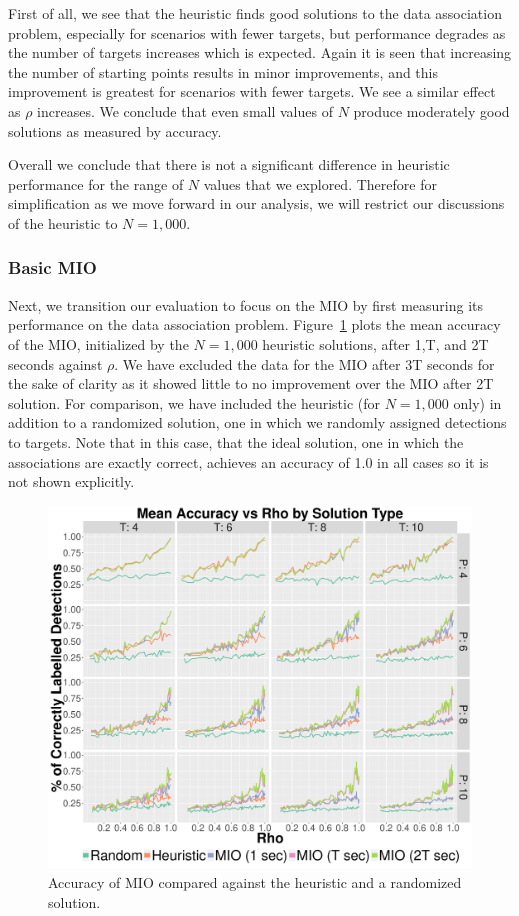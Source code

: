 First of all, we see that the heuristic finds good solutions to the data association problem, especially for scenarios with fewer targets, but performance degrades as the number of targets increases which is expected. Again it is seen that increasing the number of starting points results in minor improvements, and this improvement is greatest for scenarios with fewer targets. We see a similar effect as $\rho$ increases. We conclude that even small values of $N$ produce moderately good solutions as measured by accuracy.

Overall we conclude that there is not a significant difference in heuristic performance for the range of $N$ values that we explored. Therefore for simplification as we move forward in our analysis, we will restrict our discussions of the heuristic to $N=1,000$.

\subsubsection{Basic MIO}
Next, we transition our evaluation to focus on the MIO by first measuring its performance on the data association problem. Figure~\ref{fig:Basic_Accuracy_Summary} plots the mean accuracy of the MIO, initialized by the $N=1,000$ heuristic solutions, after 1,T, and 2T seconds against $\rho$. We have excluded the data for the MIO after 3T seconds for the sake of clarity as it showed little to no improvement over the MIO after 2T solution. For comparison, we have included the heuristic (for $N=1,000$ only) in addition to a randomized solution, one in which we randomly assigned detections to targets. Note that in this case, that the ideal solution, one in which the associations are exactly correct, achieves an accuracy of 1.0 in all cases so it is not shown explicitly.

\begin{figure}[ht]
  \centering  
  \includegraphics[width=\columnwidth]{../Figures/Basic_Accuracy_Summary}
  \caption{Accuracy of MIO compared against the heuristic and a randomized solution.}
  \label{fig:Basic_Accuracy_Summary}
\end{figure}

